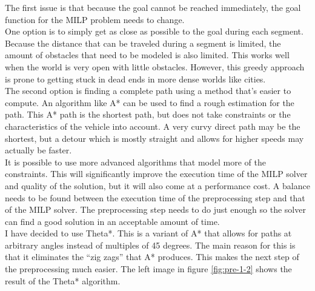 The first issue is that because the goal cannot be reached immediately, the goal function for the MILP problem needs to change.  \\
One option is to simply get as close as possible to the goal during each segment. Because the distance that can be traveled during a segment is limited, the amount of obstacles that need to be modeled is also limited. This works well when the world is very open with little obstacles. However, this greedy approach is prone to getting stuck in dead ends in more dense worlds like cities.
\\
The second option is finding a complete path using a method that's easier to compute. An algorithm like A* can be used to find a rough estimation for the path. This A* path is the shortest path, but does not take constraints or the characteristics of the vehicle into account. A very curvy direct path may be the shortest, but a detour which is mostly straight and allows for higher speeds may actually be faster. 
\\
It is possible to use more advanced algorithms that model more of the constraints. This will significantly improve the execution time of the MILP solver and quality of the solution, but it will also come at a performance cost. A balance needs to be found between the execution time of the preprocessing step and that of the MILP solver. The preprocessing step needs to do just enough so the solver can find a good solution in an acceptable amount of time. 
\\
I have decided to use Theta*. This is a variant  of A* that allows for paths at arbitrary angles instead of multiples of 45 degrees. The main reason for this is that it eliminates the ``zig zags'' that A* produces. This makes the next step of the preprocessing much easier. The left image in figure \ref{fig:pre-1-2} shows the result of the Theta* algorithm.\\



